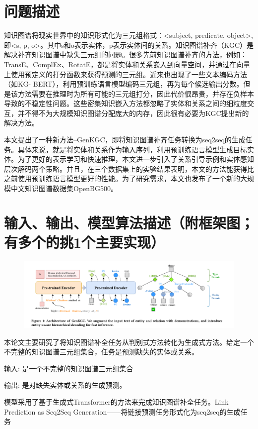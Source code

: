 \documentclass{article}
\begin{document}
\section{问题描述}
\par 知识图谱将现实世界中的知识形式化为三元组格式：<subject, predicate, object>, 即<s, p, o>。其中s和o表示实体，p表示实体间的关系。知识图谱补齐（KGC）是解决补齐知识图谱中缺失三元组的问题。很多先前知识图谱补齐的方法，例如：TransE、ComplEx、RotatE，都是将实体和关系嵌入到向量空间，并通过在向量上使用预定义的打分函数来获得预测的三元组。近来也出现了一些文本编码方法（如KG- BERT），利用预训练语言模型编码三元组，再为每个候选输出分数。但是该方法需要在推理时为所有可能的三元组打分，因此代价很昂贵，并存在负样本导致的不稳定性问题。这些密集知识嵌入方法都忽略了实体和关系之间的细粒度交互，并不得不为大规模知识图谱分配庞大的内存，因此很有必要为KGC提出新的解决方法。

\par 本文提出了一种新方法--GenKGC，即将知识图谱补齐任务转换为seq2seq的生成任务。具体来说，就是将实体和关系作为输入序列，利用预训练语言模型生成目标实体。为了更好的表示学习和快速推理，本文进一步引入了关系引导示例和实体感知层次解码两个策略。并且，在三个数据集上的实验结果表明，本文的方法能获得比之前使用预训练语言模型更好的性能。为了研究需求，本文也发布了一个新的大规模中文知识图谱数据集OpenBG500。

\section{输入、输出、模型算法描述（附框架图；有多个的挑1个主要实现）}
\begin{figure}[htp]
        \centering
        \includegraphics[width=16cm]{框架.png}
        \caption{}
        \label{pic7}
\end{figure}
\par 本论文主要研究了将知识图谱补全任务从判别式方法转化为生成式方法。给定一个不完整的知识图谱三元组集合，任务是预测缺失的实体或关系。

\par 输入: 是一个不完整的知识图谱三元组集合
\par 输出: 是对缺失实体或关系的生成预测。
\par 模型采用了基于生成式Transformer的方法来完成知识图谱补全任务。Link Prediction as Seq2Seq Generation——将链接预测任务形式化为seq2seq的生成任务
\end{document}
